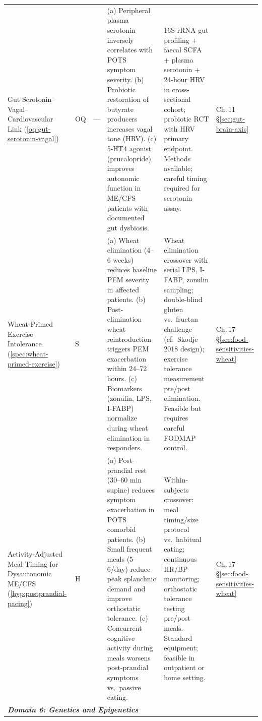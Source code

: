 \begin{longtable}{%
  p{3.0cm}
  >{\centering\arraybackslash}p{0.55cm}
  >{\centering\arraybackslash}p{1.0cm}
  p{3.8cm}
  p{3.8cm}
  p{2.2cm}
}
Gut Serotonin--Vagal--Cardiovascular Link
(\ref{oq:gut-serotonin-vagal})
&
OQ & ---
&
(a) Peripheral plasma serotonin inversely correlates with POTS symptom severity.
(b) Probiotic restoration of butyrate producers increases vagal tone (HRV).
(c) 5-HT4 agonist (prucalopride) improves autonomic function in ME/CFS patients
with documented gut dysbiosis.
&
16S rRNA gut profiling + faecal SCFA + plasma serotonin + 24-hour HRV
in cross-sectional cohort; probiotic RCT with HRV primary endpoint.
Methods available; careful timing required for serotonin assay.
&
Ch.\,11 \S\ref{sec:gut-brain-axis} \\[6pt]

Wheat-Primed Exercise Intolerance
(\ref{spec:wheat-primed-exercise})
&
S & 0.35
&
(a) Wheat elimination (4--6 weeks) reduces baseline PEM severity in affected
patients.
(b) Post-elimination wheat reintroduction triggers PEM exacerbation within
24--72 hours.
(c) Biomarkers (zonulin, LPS, I-FABP) normalize during wheat elimination in
responders.
&
Wheat elimination crossover with serial LPS, I-FABP, zonulin sampling;
double-blind gluten vs.\ fructan challenge (cf.\ Skodje 2018 design);
exercise tolerance measurement pre/post elimination.
Feasible but requires careful FODMAP control.
&
Ch.\,17 \S\ref{sec:food-sensitivities-wheat} \\[6pt]

Activity-Adjusted Meal Timing for Dysautonomic ME/CFS
(\ref{hyp:postprandial-pacing})
&
H & 0.50
&
(a) Post-prandial rest (30--60 min supine) reduces symptom exacerbation in POTS
comorbid patients.
(b) Small frequent meals (5--6/day) reduce peak splanchnic demand and improve
orthostatic tolerance.
(c) Concurrent cognitive activity during meals worsens post-prandial symptoms
vs.\ passive eating.
&
Within-subjects crossover: meal timing/size protocol vs.\ habitual eating;
continuous HR/BP monitoring; orthostatic tolerance testing pre/post meals.
Standard equipment; feasible in outpatient or home setting.
&
Ch.\,17 \S\ref{sec:food-sensitivities-wheat} \\[6pt]

\multicolumn{6}{l}{\small\textit{\textbf{Domain 6: Genetics and Epigenetics}}} \\[2pt]


\end{longtable}
